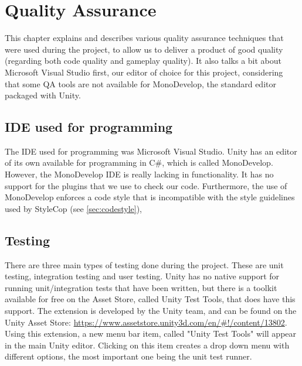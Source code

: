 \chapter{Quality Assurance} \label{cha:qa}
	This chapter explains and describes various quality assurance techniques 
	that were used during the project, to allow us to deliver a product of 
	good quality (regarding both code quality and gameplay quality). It also
	talks a bit about Microsoft Visual Studio first, our editor of choice for
	this project, considering that some QA tools are not available for
	MonoDevelop, the standard editor packaged with Unity.
	
	\section{IDE used for programming} \label{sec:ide}
		The IDE used for programming was Microsoft Visual Studio. Unity has an editor
		of its own available for programming in C\#, which is called MonoDevelop.
		However, the MonoDevelop IDE is really lacking in functionality. It has no
		support for the plugins that we use to check our code. Furthermore, the use
		of MonoDevelop enforces a code style that is incompatible with the style 
		guidelines used by StyleCop (see \ref{sec:codestyle}), 
	
	\section{Testing} \label{sec:testing}
		There are three main types of testing done during the project. These are
		unit testing, integration testing and user testing. Unity has no native
		support for running unit\slash integration tests that have been written,
		but there is a toolkit available for free on the Asset Store, called
		Unity Test Tools,  that does have this support. The extension is
		developed by the Unity team, and can be found on the Unity Asset Store: 
		\url{https://www.assetstore.unity3d.com/en/#!/content/13802}.
		Using this extension, a new menu bar item, called "Unity Test Tools"
		will appear in the main Unity editor. Clicking on this item creates a drop
		down menu with different options, the most important one being the unit test
		runner.
		
